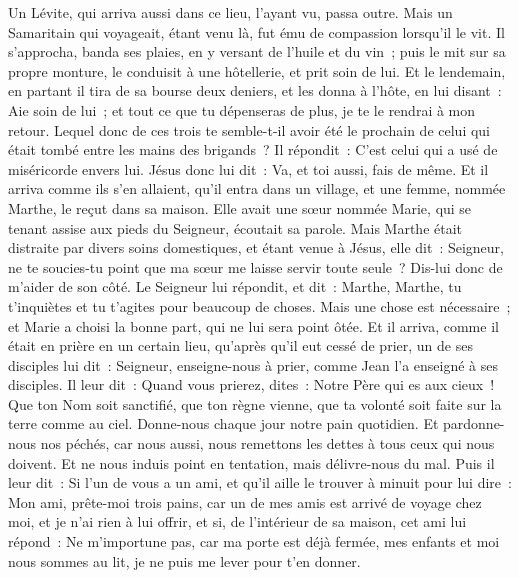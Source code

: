 \begin{multicols}{2}
Un Lévite, qui arriva aussi dans ce lieu, l'ayant vu, passa outre.
Mais un Samaritain qui voyageait, étant venu là, fut ému de compassion lorsqu'il le vit.
Il s'approcha, banda ses plaies, en y versant de l'huile et du vin~; puis le mit sur sa propre monture, le conduisit à une hôtellerie, et prit soin de lui.
Et le lendemain, en partant il tira de sa bourse deux deniers, et les donna à l'hôte, en lui disant~: Aie soin de lui~; et tout ce que tu dépenseras de plus, je te le rendrai à mon retour.
Lequel donc de ces trois te semble-t-il avoir été le prochain de celui qui était tombé entre les mains des brigands~?
Il répondit~: C'est celui qui a usé de miséricorde envers lui. Jésus donc lui dit~: Va, et toi aussi, fais de même.
Et il arriva comme ils s'en allaient, qu'il entra dans un village, et une femme, nommée Marthe, le reçut dans sa maison.
Elle avait une sœur nommée Marie, qui se tenant assise aux pieds du Seigneur, écoutait sa parole.
Mais Marthe était distraite par divers soins domestiques, et étant venue à Jésus, elle dit~: Seigneur, ne te soucies-tu point que ma sœur me laisse servir toute seule~? Dis-lui donc de m'aider de son côté.
Le Seigneur lui répondit, et dit~: Marthe, Marthe, tu t'inquiètes et tu t'agites pour beaucoup de choses.
Mais une chose est nécessaire~; et Marie a choisi la bonne part, qui ne lui sera point ôtée.
\VerseOne{}Et il arriva, comme il était en prière en un certain lieu, qu'après qu'il eut cessé de prier, un de ses disciples lui dit~: Seigneur, enseigne-nous à prier, comme Jean l'a enseigné à ses disciples.
Il leur dit~: Quand vous prierez, dites~: Notre Père qui es aux cieux~! Que ton Nom soit sanctifié, que ton règne vienne, que ta volonté soit faite sur la terre comme au ciel.
Donne-nous chaque jour notre pain quotidien.
Et pardonne-nous nos péchés, car nous aussi, nous remettons les dettes à tous ceux qui nous doivent. Et ne nous induis point en tentation, mais délivre-nous du mal.
Puis il leur dit~: Si l'un de vous a un ami, et qu'il aille le trouver à minuit pour lui dire~: Mon ami, prête-moi trois pains,
car un de mes amis est arrivé de voyage chez moi, et je n'ai rien à lui offrir,
et si, de l'intérieur de sa maison, cet ami lui répond~: Ne m'importune pas, car ma porte est déjà fermée, mes enfants et moi nous sommes au lit, je ne puis me lever pour t'en donner.

\end{multicols}
